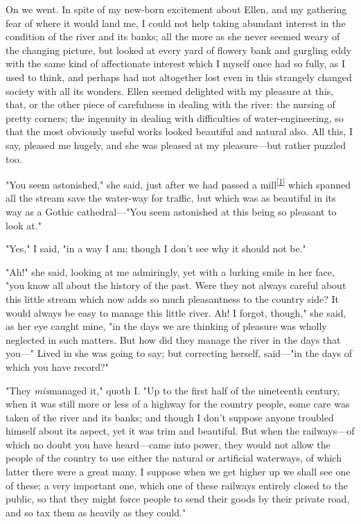 On we went. In spite of my new-born excitement about Ellen, and my
gathering fear of where it would land me, I could not help taking
abundant interest in the condition of the river and its banks; all the
more as she never seemed weary of the changing picture, but looked at
every yard of flowery bank and gurgling eddy with the same kind of
affectionate interest which I myself once had so fully, as I used to
think, and perhaps had not altogether lost even in this strangely
changed society with all its wonders. Ellen seemed delighted with my
pleasure at this, that, or the other piece of carefulness in dealing
with the river: the nursing of pretty corners; the ingenuity in dealing
with difficulties of water-engineering, so that the most obviously
useful works looked beautiful and natural also. All this, I say, pleased
me hugely, and she was pleased at my pleasure---but rather puzzled too.

"You seem astonished," she said, just after we had passed a
mill\textsuperscript{\protect\hyperlink{cite_note-1}{{[}1{]}}} which
spanned all the stream save the water-way for traffic, but which was as
beautiful in its way as a Gothic cathedral---"You seem astonished at
this being so pleasant to look at."

"Yes," I said, "in a way I am; though I don't see why it should not be."

"Ah!" she said, looking at me admiringly, yet with a lurking smile in
her face, "you know all about the history of the past. Were they not
always careful about this little stream which now adds so much
pleasantness to the country side? It would always be easy to manage this
little river. Ah! I forgot, though," she said, as her eye caught mine,
"in the days we are thinking of pleasure was wholly neglected in such
matters. But how did they manage the river in the days that you---"
Lived in she was going to say; but correcting herself, said---"in the
days of which you have record?"

"They \emph{mis}managed it," quoth I. "Up to the first half of the
nineteenth century, when it was still more or less of a highway for the
country people, some care was taken of the river and its banks; and
though I don't suppose anyone troubled himself about its aspect, yet it
was trim and beautiful. But when the railways---of which no doubt you
have heard---came into power, they would not allow the people of the
country to use either the natural or artificial waterways, of which
latter there were a great many. I suppose when we get higher up we shall
see one of these; a very important one, which one of these railways
entirely closed to the public, so that they might force people to send
their goods by their private road, and so tax them as heavily as they
could."

